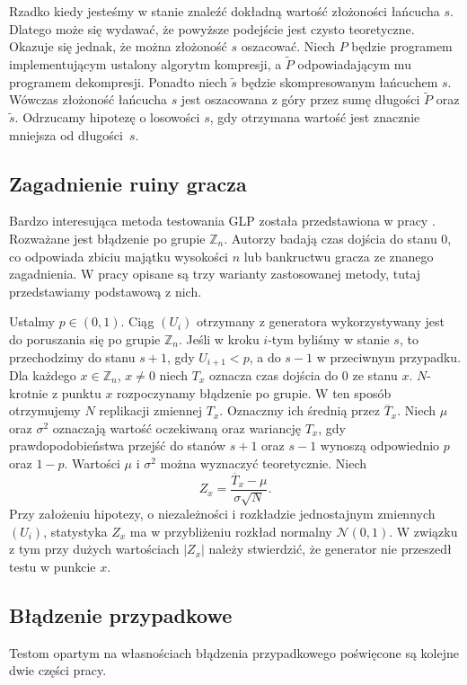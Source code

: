 \documentclass[a4paper,11pt,twoside]{book}
\theoremstyle{definition}
\begin{document}
Rzadko kiedy jesteśmy w stanie znaleźć dokładną wartość złożoności łańcucha $s$. Dlatego może się wydawać, że powyższe podejście jest czysto teoretyczne. Okazuje się jednak, że można złożoność $s$ oszacować. Niech $P$ będzie programem implementującym ustalony algorytm kompresji, a $\tilde{P}$ odpowiadającym mu programem dekompresji. Ponadto niech $\tilde{s}$ będzie skompresowanym łańcuchem $s$. Wówczas złożoność łańcucha $s$ jest oszacowana z góry przez sumę długości $\tilde{P}$ oraz $\tilde{s}$. Odrzucamy hipotezę o losowości $s$, gdy otrzymana wartość jest znacznie mniejsza od długości~$s$.

\subsection*{Zagadnienie ruiny gracza}
Bardzo interesująca metoda testowania GLP została przedstawiona w pracy \cite{kim-choe}. Rozważane jest błądzenie po grupie $\mathbb{Z}_n$. Autorzy badają czas dojścia do stanu $0$, co odpowiada zbiciu majątku wysokości $n$ lub bankructwu gracza ze znanego zagadnienia. W pracy opisane są trzy warianty zastosowanej metody, tutaj przedstawiamy podstawową z nich.

Ustalmy $p \in (0,1)$. Ciąg $(U_i)$ otrzymany z generatora wykorzystywany jest do poruszania się po grupie $\mathbb{Z}_n$. Jeśli w kroku $i$-tym byliśmy w stanie $s$, to przechodzimy do stanu $s+1$, gdy $U_{i+1} < p$, a do $s-1$ w przeciwnym przypadku. Dla każdego $x \in \mathbb{Z}_n$, $x \neq 0$ niech $T_x$ oznacza czas dojścia do $0$ ze stanu $x$. $N$-krotnie z punktu $x$ rozpoczynamy błądzenie po grupie. W ten sposób otrzymujemy $N$ replikacji zmiennej $T_x$. Oznaczmy ich średnią przez $\overline{T}_x$. Niech $\mu$ oraz $\sigma^2$ oznaczają wartość oczekiwaną oraz wariancję $T_x$, gdy prawdopodobieństwa przejść do stanów $s+1$ oraz $s-1$ wynoszą odpowiednio $p$ oraz $1-p$. Wartości $\mu$ i $\sigma^2$ można wyznaczyć teoretycznie. Niech
\[ Z_x = \frac{\overline{T}_x - \mu}{\sigma \sqrt{N}}. \]
Przy założeniu hipotezy, o niezależności i rozkładzie jednostajnym zmiennych $(U_i)$, statystyka $Z_x$ ma w przybliżeniu rozkład normalny $\mathcal{N}(0,1)$. W związku z tym przy dużych wartościach $|Z_x|$ należy stwierdzić, że generator nie przeszedł testu w punkcie $x$. 

\subsection*{Błądzenie przypadkowe}
Testom opartym na własnościach błądzenia przypadkowego poświęcone są kolejne dwie części pracy.
\end{document}

